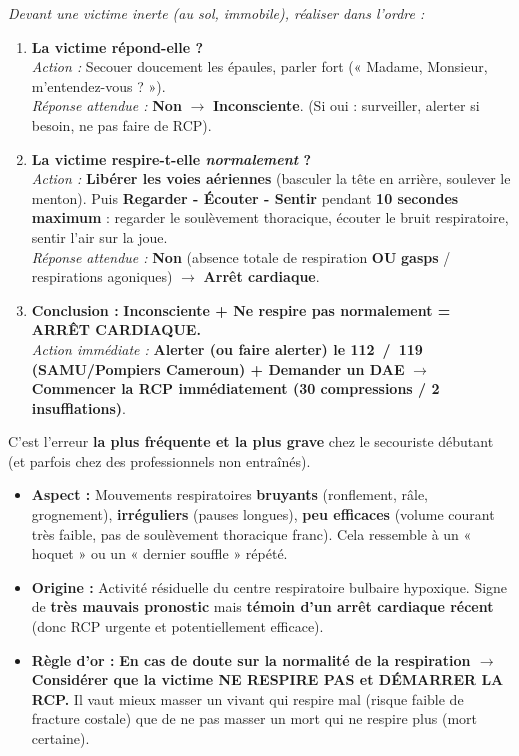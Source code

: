 \documentclass[11pt]{article}
\begin{document}
\begin{methode}
\emph{Devant une victime inerte (au sol, immobile), réaliser dans l'ordre :}
\begin{enumerate}
    \item \textbf{La victime répond-elle ?} \\
    \emph{Action :} Secouer doucement les épaules, parler fort (« Madame, Monsieur, m'entendez-vous ? »). \\
    \emph{Réponse attendue :} \textbf{Non} $\rightarrow$ \textbf{Inconsciente}. (Si oui : surveiller, alerter si besoin, ne pas faire de RCP).
    \item \textbf{La victime respire-t-elle \emph{normalement} ?} \\
    \emph{Action :} \textbf{Libérer les voies aériennes} (basculer la tête en arrière, soulever le menton). Puis \textbf{Regarder - Écouter - Sentir} pendant \textbf{10 secondes maximum} : regarder le soulèvement thoracique, écouter le bruit respiratoire, sentir l'air sur la joue. \\
    \emph{Réponse attendue :} \textbf{Non} (absence totale de respiration \textbf{OU} \textbf{gasps} / respirations agoniques) $\rightarrow$ \textbf{Arrêt cardiaque}.
    \item \textbf{Conclusion :} \textbf{Inconsciente + Ne respire pas normalement = ARRÊT CARDIAQUE.} \\
    \emph{Action immédiate :} \textbf{Alerter (ou faire alerter) le \SI{112}{/119} (SAMU/Pompiers Cameroun) + Demander un DAE} $\rightarrow$ \textbf{Commencer la RCP immédiatement (30 compressions / 2 insufflations)}.
\end{enumerate}
\end{methode}

\begin{attention}
C'est l'erreur \textbf{la plus fréquente et la plus grave} chez le secouriste débutant (et parfois chez des professionnels non entraînés).
\begin{itemize}
    \item \textbf{Aspect :} Mouvements respiratoires \textbf{bruyants} (ronflement, râle, grognement), \textbf{irréguliers} (pauses longues), \textbf{peu efficaces} (volume courant très faible, pas de soulèvement thoracique franc). Cela ressemble à un « hoquet » ou un « dernier souffle » répété.
    \item \textbf{Origine :} Activité résiduelle du centre respiratoire bulbaire hypoxique. Signe de \textbf{très mauvais pronostic} mais \textbf{témoin d'un arrêt cardiaque récent} (donc RCP urgente et potentiellement efficace).
    \item \textbf{Règle d'or :} \textbf{En cas de doute sur la normalité de la respiration $\rightarrow$ Considérer que la victime NE RESPIRE PAS et DÉMARRER LA RCP.} Il vaut mieux masser un vivant qui respire mal (risque faible de fracture costale) que de ne pas masser un mort qui ne respire plus (mort certaine).
\end{itemize}
\end{attention}
\end{document}
